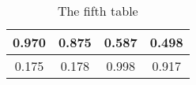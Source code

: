 \begin{longtable}{|SSSS|}
\caption{The fifth table}\label{table5}\\
\toprule

0.970	&0.875	&0.587	&0.498	\\\hline

0.175	&0.178	&0.998	&0.917	\\

\bottomrule
\end{longtable}